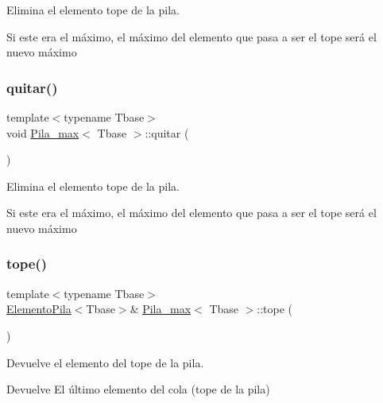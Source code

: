 Elimina el elemento tope de la pila. 

Si este era el máximo, el máximo del elemento que pasa a ser el tope será el nuevo máximo \mbox{\label{classPila__max_a362d8228e46eff38e2d5827a4726b9e9}} 
\subsubsection{\texorpdfstring{quitar()}{quitar()}\hspace{0.1cm}{\footnotesize\ttfamily [2/2]}}
{\footnotesize\ttfamily template$<$typename Tbase$>$ \\
void \hyperlink{classPila__max}{Pila\+\_\+max}$<$ Tbase $>$\+::quitar (\begin{DoxyParamCaption}{ }\end{DoxyParamCaption})}



Elimina el elemento tope de la pila. 

Si este era el máximo, el máximo del elemento que pasa a ser el tope será el nuevo máximo \mbox{\label{classPila__max_a7d89c4740df471a1d6d0a41f9308406f}} 
\subsubsection{\texorpdfstring{tope()}{tope()}\hspace{0.1cm}{\footnotesize\ttfamily [1/4]}}
{\footnotesize\ttfamily template$<$typename Tbase$>$ \\
\hyperlink{structElementoPila}{Elemento\+Pila}$<$Tbase$>$\& \hyperlink{classPila__max}{Pila\+\_\+max}$<$ Tbase $>$\+::tope (\begin{DoxyParamCaption}{ }\end{DoxyParamCaption})}



Devuelve el elemento del tope de la pila. 

\begin{DoxyReturn}{Devuelve}
El último elemento del cola (tope de la pila) 
\end{DoxyReturn}
\mbox{\label{classPila__max_a7d89c4740df471a1d6d0a41f9308406f}} 
